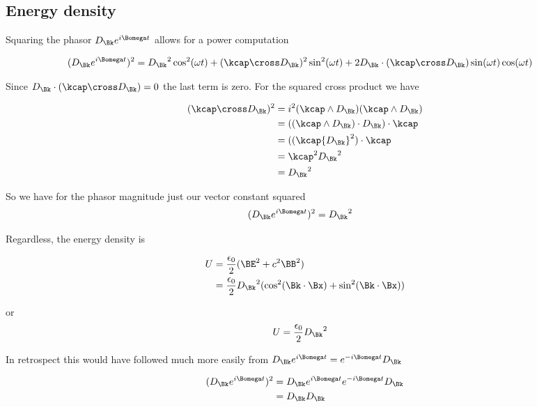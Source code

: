 \documentclass[]{eliblog}
\begin{document}
\subsection{Energy density}

Squaring the phasor $D_\Bk e^{i\Bomega t}$ allows for a power computation

\begin{align*}
(D_\Bk e^{i\Bomega t} )^2
&=
{D_\Bk}^2 \cos^2(\omega t) + (\kcap \cross D_\Bk)^2 \sin^2(\omega t) + 2 D_\Bk \cdot (\kcap \cross D_\Bk) \sin(\omega t) \cos(\omega t)
\end{align*}

Since $D_\Bk \cdot (\kcap \cross D_\Bk) = 0$ the last term is zero.  For the squared cross product we have

\begin{align*}
(\kcap \cross D_\Bk)^2
&= i^2 
(\kcap \wedge D_\Bk) (\kcap \wedge D_\Bk) \\
&= 
((\kcap \wedge D_\Bk) \cdot D_\Bk ) \cdot \kcap  \\
&= 
((\kcap {D_\Bk}^2 ) \cdot \kcap  \\
&= 
\kcap^2 {D_\Bk}^2  \\
&= 
{D_\Bk}^2 
\end{align*}

So we have for the phasor magnitude just our vector constant squared
\begin{align}
(D_\Bk e^{i\Bomega t} )^2
&= 
{D_\Bk}^2 
\end{align}


Regardless, the energy density is

\begin{align*}
U 
&= \frac{\epsilon_0}{2}(\BE^2 + c^2 \BB^2) \\
&= \frac{\epsilon_0}{2} {D_\Bk}^2 ( \cos^2(\Bk \cdot \Bx) +\sin^2(\Bk \cdot \Bx) )
\end{align*}

or
\begin{align}
U &= \frac{\epsilon_0}{2} {D_\Bk}^2 
\end{align}

In retrospect this would have followed much more easily from $D_\Bk e^{i\Bomega t} = e^{-i\Bomega t} D_\Bk$

\begin{align*}
(D_\Bk e^{i\Bomega t} )^2
&=
D_\Bk e^{i\Bomega t} e^{-i\Bomega t} D_\Bk \\
&=
D_\Bk D_\Bk \\
\end{align*}
\end{document}
